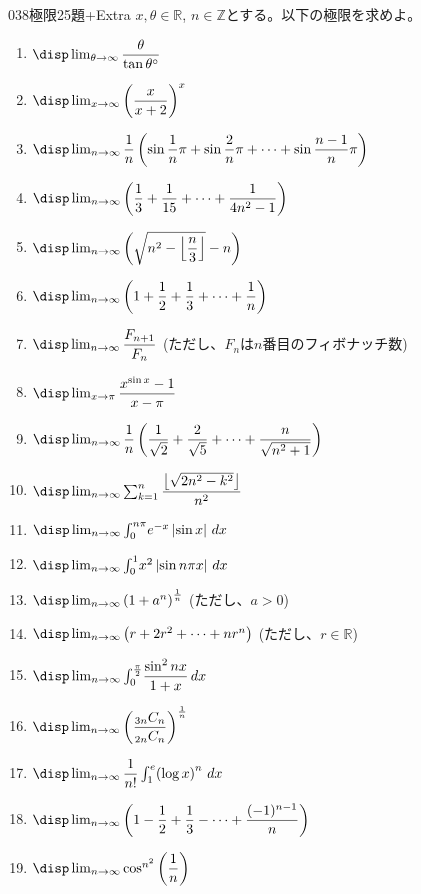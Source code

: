 \begin{prob}{038}{}{極限25題+Extra}
 $x,\theta\in\mathbb{R}$, $n\in\mathbb{Z}$とする。以下の極限を求めよ。
 \begin{enumerate}
  \item $\disp \lim_{\theta\to\infty} \dfrac{\theta}{\tan\theta^\circ}$
  \item $\disp \lim_{x\to\infty} \left(\dfrac{x}{x+2}\right)^x$
  \item $\disp \lim_{n\to\infty} \dfrac{1}{n}\left(\sin\dfrac{1}{n}\pi+\sin\dfrac{2}{n}\pi+\cdots +\sin\dfrac{n-1}{n}\pi\right)$
  \item $\disp \lim_{n\to\infty}\left(\dfrac{1}{3}+\dfrac{1}{15}+\cdots+\dfrac{1}{4n^2-1}\right)$
  \item $\disp \lim_{n\to\infty} \left(\sqrt{n^2-\left\lfloor\dfrac{n}{3}\right\rfloor}-n\right)$
  \item $\disp \lim_{n\to\infty} \left(1+\dfrac{1}{2}+\dfrac{1}{3}+\cdots+\dfrac{1}{n}\right)$
  \item $\disp \lim_{n\to\infty} \dfrac{F_{n+1}}{F_n}$ (ただし、$F_n$は$n$番目のフィボナッチ数)
  \item $\disp \lim_{x\to\pi} \dfrac{x^{\sin x}-1}{x-\pi}$
  \item $\disp \lim_{n\to\infty }\dfrac{1}{n}\left(\dfrac{1}{\sqrt{2}}+\dfrac{2}{\sqrt{5}}+\cdots+\dfrac{n}{\sqrt{n^2+1}}\right)$
  \item $\disp \lim_{n\to\infty} \sum_{k=1}^n \dfrac{\left\lfloor\sqrt{2n^2-k^2}\right\rfloor}{n^2}$
  \item $\disp \lim_{n\to\infty} \int_0^{n\pi}\! e^{-x}\left|\sin x\right|\,dx$
  \item $\disp \lim_{n\to\infty} \int_0^1\! x^2\left|\sin n\pi x\right|\,dx$
  \item $\disp \lim_{n\to\infty} \left(1+a^n\right)^{\frac{1}{n}}$ (ただし、$a>0$)
  \item $\disp \lim_{n\to\infty} \left(r+2r^2+\cdots+nr^n\right)$ (ただし、$r\in\mathbb{R}$)
  \item $\disp \lim_{n\to\infty} \int_0^{\frac{\pi}{2}}\! \dfrac{\sin^2nx}{1+x} \,dx$
  \item $\disp \lim_{n\to\infty} \left(\dfrac{{}_{3n}C_n}{{}_{2n}C_n}\right)^\frac{1}{n}$
  \item $\disp \lim_{n\to\infty} \dfrac{1}{n!}\int_1^e\! \left(\log x\right)^n \,dx$
  \item $\disp \lim_{n\to\infty} \left(1-\dfrac{1}{2}+\dfrac{1}{3}-\cdots+\dfrac{(-1)^{n-1}}{n}\right)$
  \item $\disp \lim_{n\to\infty} \cos^{n^2}\left(\dfrac{1}{n}\right)$

\end{enumerate}
\end{prob}
